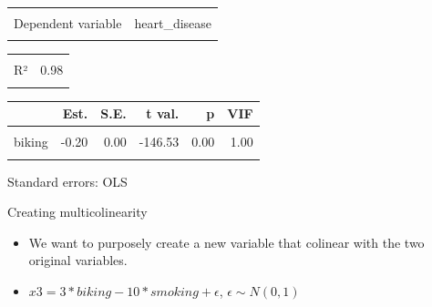\documentclass[
  ignorenonframetext,
]{beamer}
\begin{document}
\begin{frame}{}
\protect\hypertarget{section-13}{}
\begin{table}[!h]
\centering
\begin{tabular}{lr}
\toprule
\cellcolor{gray!6}{Observations} & \cellcolor{gray!6}{498}\\
Dependent variable & heart\_disease\\
\cellcolor{gray!6}{Type} & \cellcolor{gray!6}{OLS linear regression}\\
\bottomrule
\end{tabular}
\end{table} \begin{table}[!h]
\centering
\begin{tabular}{lr}
\toprule
\cellcolor{gray!6}{F(2,495)} & \cellcolor{gray!6}{11895.24}\\
R² & 0.98\\
\cellcolor{gray!6}{Adj. R²} & \cellcolor{gray!6}{0.98}\\
\bottomrule
\end{tabular}
\end{table} \begin{table}[!h]
\centering
\begin{threeparttable}
\begin{tabular}{lrrrrr}
\toprule
  & Est. & S.E. & t val. & p & VIF\\
\midrule
\cellcolor{gray!6}{(Intercept)} & \cellcolor{gray!6}{14.98} & \cellcolor{gray!6}{0.08} & \cellcolor{gray!6}{186.99} & \cellcolor{gray!6}{0.00} & \cellcolor{gray!6}{NA}\\
biking & -0.20 & 0.00 & -146.53 & 0.00 & 1.00\\
\cellcolor{gray!6}{smoking} & \cellcolor{gray!6}{0.18} & \cellcolor{gray!6}{0.00} & \cellcolor{gray!6}{50.39} & \cellcolor{gray!6}{0.00} & \cellcolor{gray!6}{1.00}\\
\bottomrule
\end{tabular}
\begin{tablenotes}
\item Standard errors: OLS
\end{tablenotes}
\end{threeparttable}
\end{table}
\end{frame}

\begin{frame}{Creating multicolinearity}
\protect\hypertarget{creating-multicolinearity}{}
\begin{itemize}
\item
  We want to purposely create a new variable that colinear with the two
  original variables.
\item
  \(x3 = 3*biking - 10*smoking + \epsilon\), \(\epsilon \sim N(0,1)\)
\end{itemize}
\end{frame}
\end{document}
